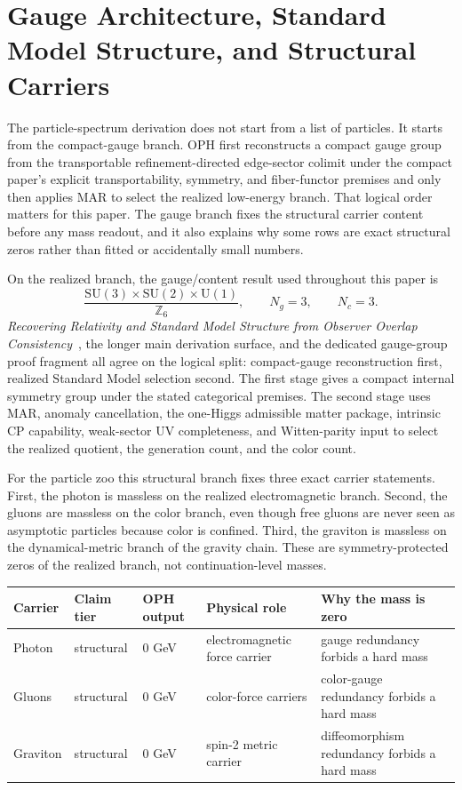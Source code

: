 \documentclass[11pt]{article}
\newcommand{\SU}{\mathrm{SU}}
\newcommand{\U}{\mathrm{U}}
\begin{document}
\section{Gauge Architecture, Standard Model Structure, and Structural Carriers}

The particle-spectrum derivation does not start from a list of particles. It starts from the
compact-gauge branch. OPH first reconstructs a compact gauge
group from the transportable refinement-directed edge-sector colimit under the compact paper's
explicit transportability, symmetry, and fiber-functor premises and only then applies MAR to
select the realized low-energy branch. That logical order matters for this paper. The
gauge branch fixes the structural carrier content before any mass readout, and it also explains
why some rows are exact structural zeros rather than fitted or accidentally small numbers.

On the realized branch, the gauge/content result used throughout this paper is
\[
\frac{\SU(3)\times\SU(2)\times\U(1)}{\mathbb Z_6},
\qquad
N_g=3,
\qquad
N_c=3.
\]
\emph{Recovering Relativity and Standard Model Structure from Observer Overlap Consistency}~\cite{ophcompact}, the longer main derivation surface, and the dedicated gauge-group proof
fragment all agree on the logical split: compact-gauge reconstruction first, realized Standard
Model selection second. The first stage gives a compact internal symmetry group under the stated
categorical premises. The second stage uses MAR, anomaly cancellation, the one-Higgs admissible
matter package, intrinsic CP capability, weak-sector UV completeness, and Witten-parity input to
select the realized quotient, the generation count, and the color count.

For the particle zoo this structural branch fixes three exact carrier statements.
First, the photon is massless on the realized electromagnetic branch. Second, the gluons are
massless on the color branch, even though free gluons are never seen as asymptotic particles
because color is confined. Third, the graviton is massless on the dynamical-metric branch of the
gravity chain. These are symmetry-protected zeros of the realized branch, not continuation-level
masses.

\begin{table}[h]
\centering
\small
\begin{tabular}{@{}>{\raggedright\arraybackslash}p{}>{\raggedright\arraybackslash}p{}>{\raggedright\arraybackslash}p{}>{\raggedright\arraybackslash}p{}>{\raggedright\arraybackslash}p{}@{}}
\toprule
Carrier & Claim tier & OPH output & Physical role & Why the mass is zero \\
\midrule
Photon & structural & \(0\) GeV & electromagnetic force carrier & gauge redundancy forbids a hard mass \\
Gluons & structural & \(0\) GeV & color-force carriers & color-gauge redundancy forbids a hard mass \\
Graviton & structural & \(0\) GeV & spin-2 metric carrier & diffeomorphism redundancy forbids a hard mass \\
\bottomrule
\end{tabular}
\end{table}
\end{document}
